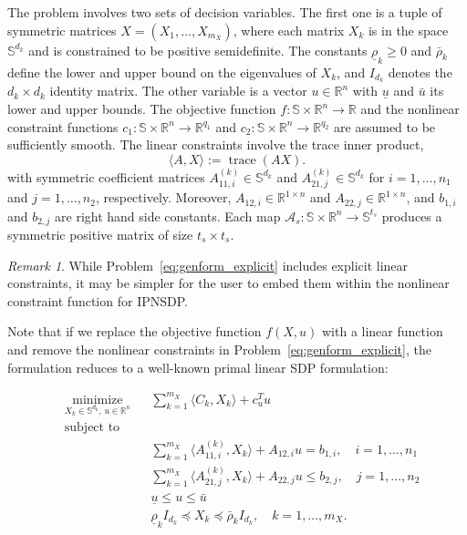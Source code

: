 \documentclass[]{interact}
\theoremstyle{plain}%
\theoremstyle{definition}
\theoremstyle{remark}
\newtheorem{remark}{Remark}
\begin{document}
The problem involves two sets of decision variables. The first one is a tuple of symmetric matrices $X = (X_1, \ldots, X_{m_X})$, where each matrix $X_k$ is in the space $\mathbb{S}^{d_k}$ and is constrained to be positive semidefinite. The constants \( \underline{\rho}_k \geq 0 \) and  \( \bar{\rho}_k \) define the lower and upper bound on the eigenvalues of \( X_k \), and \( I_{d_k} \) denotes the \( d_k \times d_k \) identity matrix. The other variable is a vector $u \in \mathbb{R}^n$ with \(\underline{u}\) and \(\bar{u}\) its lower and upper bounds. The objective function \( f: \mathbb{S} \times \mathbb{R}^n \to \mathbb{R} \) and the nonlinear constraint functions \( c_1: \mathbb{S} \times \mathbb{R}^n \to \mathbb{R}^{q_1} \) and \( c_2: \mathbb{S} \times \mathbb{R}^n \to \mathbb{R}^{q_2} \) are assumed to be sufficiently smooth. The linear constraints involve the trace inner product,
\begin{equation}\label{eq:inner_pro}
\langle A, X \rangle := \operatorname{trace}(A  X).
\end{equation}
with symmetric coefficient matrices $A_{11,i}^{(k)} \in \mathbb{S}^{d_k}$ and $A_{21,j}^{(k)} \in \mathbb{S}^{d_k}$ for $i = 1, \ldots, n_1$ and $j = 1, \ldots, n_2$, respectively.
Moreover, $A_{12,i} \in \mathbb{R}^{1 \times n}$ and $A_{22,j} \in \mathbb{R}^{1 \times n}$, and $b_{1,i}$ and $b_{2,j}$ are right hand side constants. Each map $\mathcal{A}_s : \mathbb{S} \times \mathbb{R}^n \to \mathbb{S}^{t_s}$ produces a symmetric  positive matrix of size $t_s \times t_s$.

\begin{remark}
While Problem~\eqref{eq:genform_explicit} includes explicit linear constraints, it may be simpler for the user to embed them within the nonlinear constraint function for IPNSDP. 
\end{remark}

Note that if we replace the objective function \( f(X,u) \) with a linear function and remove the nonlinear constraints in Problem~\eqref{eq:genform_explicit}, the formulation reduces to a well-known primal linear SDP formulation:

\begin{equation}\label{eq:genform_linear}
\begin{aligned}
& \underset{X_k \in \mathbb{S}^{d_k},\, u \in \mathbb{R}^n}{\text{minimize}}
& & \sum_{k=1}^{m_X} \langle C_k, X_k \rangle + c_u^T u \\
& \text{subject to} \\
& & & \sum_{k=1}^{m_X} \langle A_{11,i}^{(k)}, X_k \rangle + A_{12,i} u = b_{1,i}, \quad i = 1, \dots, n_1 \\
& & & \sum_{k=1}^{m_X} \langle A_{21,j}^{(k)}, X_k \rangle + A_{22,j} u \leq b_{2,j}, \quad j = 1, \dots, n_2 \\
& & & \underline{u} \leq u \leq \bar{u} \\
& & & \underline{\rho}_k I_{d_k} \preceq X_k \preceq \bar{\rho}_k I_{d_k}, \quad k=1,\dots,m_X.
\end{aligned}
\end{equation}
\end{document}
